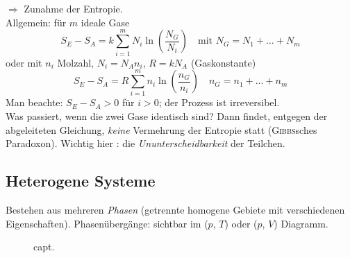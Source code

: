 $\Rightarrow$ Zunahme der Entropie. \\[\baselineskip]
Allgemein: für $m$ ideale Gase
\begin{equation}
    S_E - S_A = k \sum_{i=1}^{m} N_i \ln \left( \frac{N_G}{N_i} \right) \quad \text{mit } N_G = N_1 + \ldots + N_m
\end{equation}
oder mit $n_i$ Molzahl, $N_i = N_A n_i$, $R = k N_A$ (Gaskonstante)
\begin{equation}
    S_E - S_A = R \sum_{i=1}^{m} n_i \ln \left( \frac{n_G}{n_i} \right) \quad n_G = n_1 + \ldots + n_m
\end{equation}
Man beachte: $S_E - S_A > 0$ für $i > 0$; der Prozess ist irreversibel. \\
Was passiert, wenn die zwei Gase identisch sind? Dann findet, entgegen der abgeleiteten Gleichung, \emph{keine} Vermehrung der Entropie statt
(\textsc{Gibbs}sches Paradoxon). Wichtig hier : die \emph{Ununterscheidbarkeit} der Teilchen.

\subsection{Heterogene Systeme}
Bestehen aus mehreren \emph{Phasen} (getrennte homogene Gebiete mit verschiedenen Eigenschaften). Phasenübergänge: sichtbar im ($p$, $T$) oder
($p$, $V$) Diagramm. \\

\begin{figure}[H]
        \centering
        \def\svgwidth{\textwidth}
        
        \caption{capt.}
        \label{img:pV-pT}
\end{figure}


